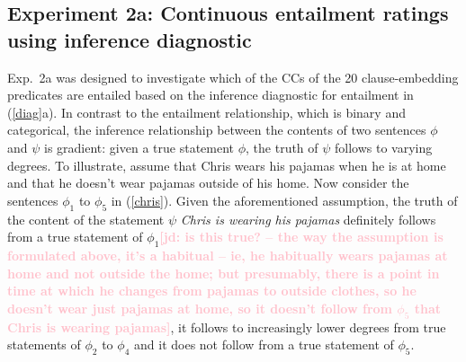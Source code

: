 \documentclass[11pt,fleqn]{article}
\newcommand{\jd}[1]{\textbf{\textcolor{Pink}{[jd: #1]}}}
\newcommand{\6}{\mbox{$[\hspace*{-.6mm}[$}}
\newcommand{\9}{\mbox{$]\hspace*{-.6mm}]$}}
\begin{document}
%
%
%
%

\subsection{Experiment 2a: Continuous entailment ratings using inference diagnostic}\label{s31}

Exp.~2a was designed to investigate which of the CCs of the 20 clause-embedding predicates are entailed based on the inference diagnostic for entailment in (\ref{diag}a). In contrast to the entailment relationship, which is binary and categorical, the inference relationship between the contents of two sentences $\phi$ and $\psi$ is gradient: given a true statement $\phi$, the truth of $\psi$ follows to varying degrees. To illustrate, assume that Chris wears his pajamas when he is at home and that he doesn't wear pajamas outside of his home. Now consider the sentences $\phi_1$ to $\phi_5$ in (\ref{chris}). Given the aforementioned assumption, the truth of the content of the statement $\psi$ {\em Chris is wearing his pajamas} definitely follows from a true statement of $\phi_1$\jd{is this true? -- the way the assumption is formulated above, it's a habitual -- ie, he habitually wears pajamas at home and not outside the home; but presumably, there is a point in time at which he changes from pajamas to outside clothes, so he doesn't wear just pajamas at home, so it doesn't follow from $\phi_5$ that Chris is wearing pajamas}, it follows to increasingly lower degrees from true statements of $\phi_2$ to $\phi_4$ and it does not follow from a true statement of $\phi_5$. 
\end{document}
